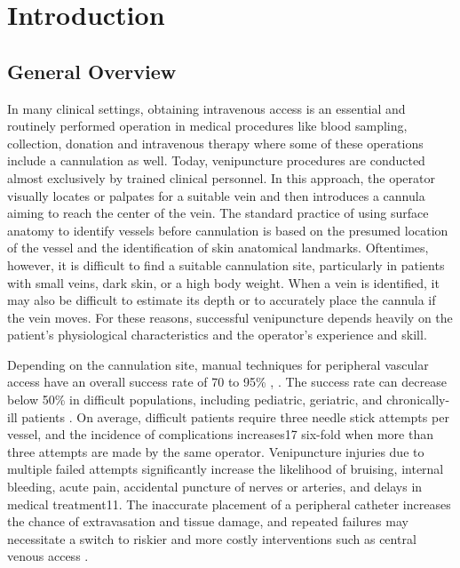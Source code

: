 
\chapter{Introduction}\label{chapter:introduction}

\section{General Overview} 

In many clinical settings, obtaining intravenous access is an essential and routinely performed operation in medical procedures like blood sampling, collection, donation and intravenous therapy where some of these operations include a cannulation as well.
Today, venipuncture procedures are conducted almost exclusively by trained clinical personnel. In this approach, the operator visually locates or palpates for a suitable vein and then introduces a cannula aiming to reach the center of the vein. The standard practice of using surface anatomy to identify vessels before cannulation is based on the presumed location of the vessel and the identification of skin anatomical landmarks. Oftentimes, however, it is difficult to find a suitable cannulation site, particularly in patients with small veins, dark skin, or a high body weight. When a vein is identified, it may also be difficult to estimate its depth or to accurately place the cannula if the vein moves. For these reasons, successful venipuncture depends heavily on the patient's physiological characteristics and the operator's experience and skill.

Depending on the cannulation site, manual techniques for peripheral vascular access have an overall success rate of 70 to 95\%  \parencite{clinicalPredi}, \parencite{comlicationsVeni1}. The success rate can decrease below 50\% in difficult populations, including pediatric, geriatric, and chronically-ill patients\parencite{comlicationsVeni2} . On average, difficult
patients require three needle stick attempts per vessel, and the incidence of complications increases17 six-fold when more than three attempts are made by the same operator. Venipuncture injuries due to multiple failed attempts significantly increase the likelihood of bruising, internal bleeding, acute pain, accidental puncture of nerves or arteries, and delays in medical treatment11. The inaccurate placement of a peripheral catheter increases the chance of extravasation and tissue damage, and repeated failures may necessitate a switch to riskier and more costly interventions such as central venous access \parencite{clinicalPredi}.  


